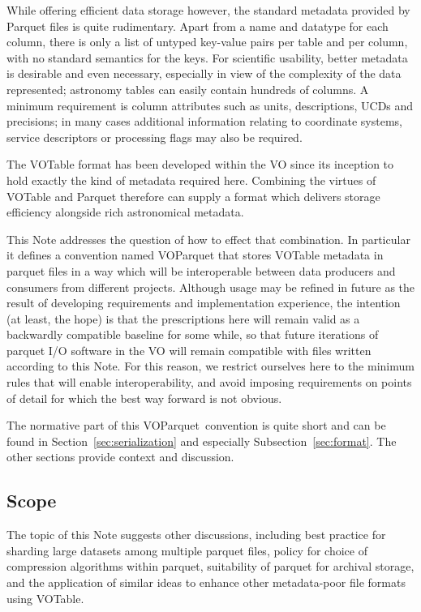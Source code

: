 \documentclass[11pt,a4paper]{ivoa}
\newcommand{\voparquet}{VOParquet}
\begin{document}
While offering efficient data storage however,
the standard metadata provided by Parquet files is quite rudimentary.
Apart from a name and datatype for each column,
there is only a list of untyped key-value pairs per table
and per column, with no standard semantics for the keys.
For scientific usability, better metadata is desirable and even necessary,
especially in view of the complexity of the data represented;
astronomy tables can easily contain hundreds of columns.
A minimum requirement is column attributes such as units, descriptions,
UCDs and precisions; in many cases additional information relating to
coordinate systems, service descriptors or processing flags
may also be required.

The VOTable format \citep{2019ivoa.spec.1021O}
has been developed within the VO since its
inception to hold exactly the kind of metadata required here.
Combining the virtues of VOTable and Parquet therefore
can supply a format which delivers storage efficiency alongside
rich astronomical metadata.

This Note addresses the question of how to effect that combination.
In particular it defines a convention named {\voparquet}
that stores VOTable metadata in parquet files in a way
which will be interoperable
between data producers and consumers from different projects.
Although usage may be refined in future as the result of
developing requirements and implementation experience,
the intention (at least, the hope) is that the
prescriptions here will remain valid as a backwardly compatible
baseline for some while, so that future iterations of parquet I/O
software in the VO will remain compatible with files written
according to this Note.
For this reason, we restrict ourselves here to the minimum rules
that will enable interoperability, and avoid imposing requirements
on points of detail for which the best way forward is not obvious.

The normative part of this \voparquet\ convention
is quite short and can be found in Section~\ref{sec:serialization}
and especially Subsection~\ref{sec:format}.
The other sections provide context and discussion.

\subsection{Scope}
\label{sec:scope}

The topic of this Note suggests other discussions, including
best practice for sharding large datasets among multiple parquet files,
policy for choice of compression algorithms within parquet,
suitability of parquet for archival storage,
and the application of similar ideas to enhance other metadata-poor
file formats using VOTable.
\end{document}
